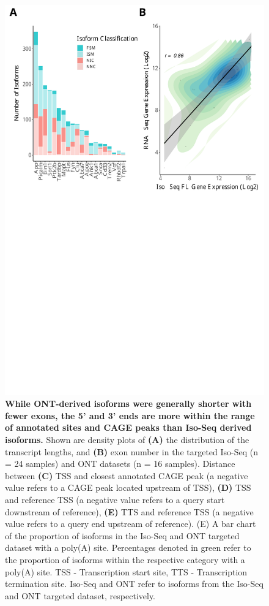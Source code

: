 \begin{figure}[!htp]
	\begin{center}
		\includegraphics[page=3,trim={0 9cm 0 0cm},clip,scale = 0.60]{Figures/ONTvsIsoSeq.pdf}
	\end{center}
	\captionsetup{width=0.95\textwidth}
	\caption[Comparison of Iso-Seq and ONT targeted datasets]%
	{\textbf{While ONT-derived isoforms were generally shorter with fewer exons, the 5' and 3' ends are more within the range of annotated sites and CAGE peaks than Iso-Seq derived isoforms.} Shown are density plots of \textbf{(A)} the distribution of the transcript lengths, and \textbf{(B)} exon number in the targeted Iso-Seq (n = 24 samples) and ONT datasets (n = 16 samples). Distance between \textbf{(C)} TSS and closest annotated CAGE peak (a negative value refers to a CAGE peak located upstream of TSS), \textbf{(D)} TSS and reference TSS (a negative value refers to a query start downstream of reference), \textbf{(E)} TTS and reference TSS (a negative value refers to a query end upstream of reference). {(E)} A bar chart of the proportion of isoforms in the Iso-Seq and ONT targeted dataset with a poly(A) site. Percentages denoted in green refer to the proportion of isoforms within the respective category with a poly(A) site. TSS - Transcription start site, TTS - Transcription termination site. Iso-Seq and ONT refer to isoforms from the Iso-Seq and ONT targeted dataset, respectively.}
	\label{fig:ont_isoseq_description}
\end{figure}


